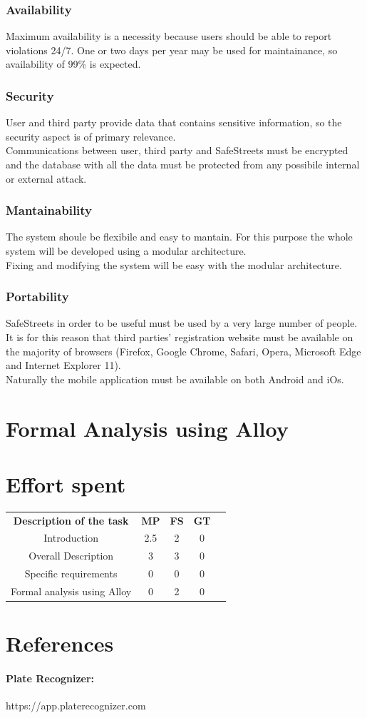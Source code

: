 \documentclass{article}
\begin{document}
\subsubsection{Availability}
Maximum availability is a necessity because users should be able to report
violations 24/7. One or two days per year may be used for maintainance, so 
availability of 99\% is expected.
\subsubsection{Security}
User and third party provide data that contains sensitive information, so the
security aspect is of primary relevance.\\ Communications between user, third
party and SafeStreets must be encrypted and the database with all the data must
be protected from any possibile internal or external attack.
\subsubsection{Mantainability}
The system shoule be flexibile and easy to mantain. For this purpose the whole
system will be developed using a modular architecture. \\
Fixing and modifying the system will be easy with the modular architecture.

\subsubsection{Portability}
SafeStreets in order to be useful must be used by a very large number of people.
It is for this reason that third parties' registration website must be available
on the majority of browsers (Firefox, Google Chrome, Safari, Opera, Microsoft
Edge and Internet Explorer 11).\\
Naturally the mobile application must be available on both Android and iOs.

\newpage
\section{Formal Analysis using Alloy}

\newpage
\section{Effort spent}
\begin{center}
    \begin{tabular}{|c|c|c|c|c|}
        \hline
        \textbf{Description of the task} & \textbf{MP} & \textbf{FS} &
        \textbf{GT} \\
        Introduction                    & 2.5   & 2     & 0     \\
        Overall Description             & 3   & 3   & 0     \\
        Specific requirements           & 0     & 0     & 0     \\
        Formal analysis using Alloy     & 0     & 2     & 0     \\
    \end{tabular}
\end{center}
\section{References}
    \paragraph{Plate Recognizer:} https://app.platerecognizer.com
    
\end{document}

